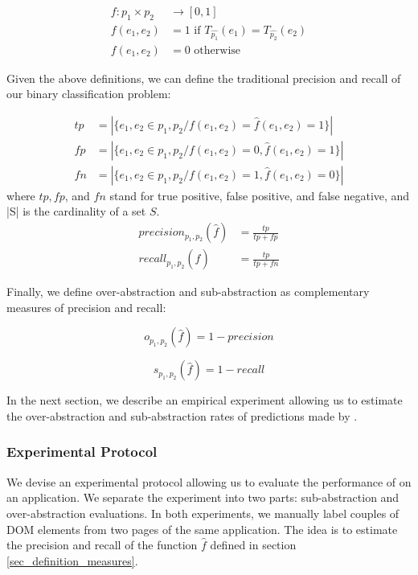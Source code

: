 \begin{defn}
\begin{align}
f:  p_1 \times p_2 & \to [0, 1] \\
f(e_1, e_2) &= 1  \text{ if $T_{\hat{p_1}}(e_1) =  T_{\hat{p_2}}(e_2)$}\\
f(e_1, e_2) &= 0 \text{ otherwise}
\end{align}
\end{defn}
Given the above definitions, we can define the traditional precision and recall of our binary classification problem:
\begin{defn}
\begin{align}
tp &=|\{e_1, e_2 \in p_1, p_2 / f(e_1, e_2) = \hat{f}(e_1, e_2) = 1\}| \\
fp &=|\{e_1, e_2 \in p_1, p_2 / f(e_1, e_2) = 0, \hat{f}(e_1, e_2) = 1\}| \\
fn &=|\{e_1, e_2 \in p_1, p_2 / f(e_1, e_2) = 1, \hat{f}(e_1, e_2) = 0\}| 
\end{align}
where $tp, fp$, and $fn$ stand for true positive, false positive, and false negative, and |S| is the cardinality of a set $S$.
\begin{align}
precision_{p_1, p_2}(\hat{f}) &= \frac{tp}{tp + fp} \\
recall_{p_1, p_2}(\hat{f})  &= \frac{tp}{tp + fn}
\end{align}
\end{defn}

Finally, we define over-abstraction and sub-abstraction as complementary measures of precision and recall:
\begin{defn}
\begin{equation}
o_{p_1, p_2}(\hat{f})  = 1 - precision
\end{equation}
\end{defn}
\begin{defn}
\begin{equation}
s_{p_1, p_2}(\hat{f})  = 1 - recall
\end{equation}
\end{defn}

In the next section, we describe an empirical experiment allowing us to estimate the over-abstraction and sub-abstraction rates of predictions made by \appstract{}. 

\subsubsection{Experimental Protocol}
We devise an experimental protocol allowing us to evaluate the performance of \appstract{} on an application.
We separate the experiment into two parts: sub-abstraction and over-abstraction evaluations.
In both experiments, we manually label couples of DOM elements from two pages of the same application.
The idea is to estimate the precision and recall of the function $\hat{f}$ defined in section \ref{sec_definition_measures}.

